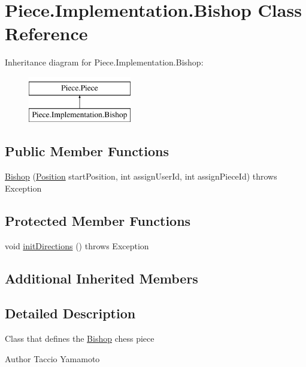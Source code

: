 \hypertarget{classPiece_1_1Implementation_1_1Bishop}{\section{Piece.\-Implementation.\-Bishop Class Reference}
\label{classPiece_1_1Implementation_1_1Bishop}
}
Inheritance diagram for Piece.\-Implementation.\-Bishop\-:\begin{figure}[H]
\begin{center}
\leavevmode
\includegraphics[height=2.000000cm]{classPiece_1_1Implementation_1_1Bishop}
\end{center}
\end{figure}
\subsection*{Public Member Functions}
\begin{DoxyCompactItemize}
\item 
\hyperlink{classPiece_1_1Implementation_1_1Bishop_a94578631257280ceb1491c0d1cd1bb6a}{Bishop} (\hyperlink{classUtil_1_1Position}{Position} start\-Position, int assign\-User\-Id, int assign\-Piece\-Id)  throws Exception 
\end{DoxyCompactItemize}
\subsection*{Protected Member Functions}
\begin{DoxyCompactItemize}
\item 
void \hyperlink{classPiece_1_1Implementation_1_1Bishop_a86c4b94d2ab033427c12df9ad20b800f}{init\-Directions} ()  throws Exception 
\end{DoxyCompactItemize}
\subsection*{Additional Inherited Members}


\subsection{Detailed Description}
Class that defines the \hyperlink{classPiece_1_1Implementation_1_1Bishop}{Bishop} chess piece \begin{DoxyAuthor}{Author}
Taccio Yamamoto 
\end{DoxyAuthor}


